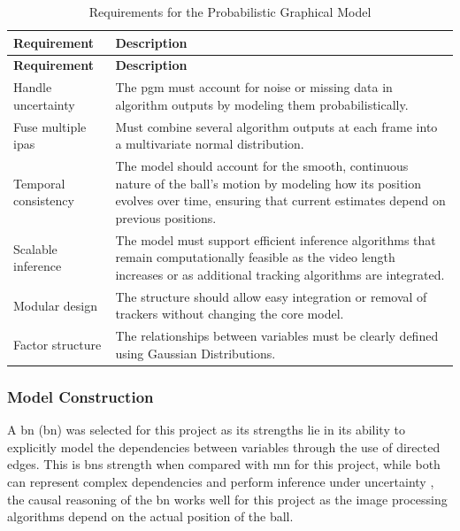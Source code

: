 \documentclass[12pt,a4paper]{article}
\begin{document}
\begin{longtable}{p{} p{}}
\caption{Requirements for the Probabilistic Graphical Model} \label{tab:pgm_requirements} \\
\hline
\textbf{Requirement} & \textbf{Description} \\
\hline
\endfirsthead
\hline
\textbf{Requirement} & \textbf{Description} \\
\hline
\endhead
\hline
\endfoot
\hline
\endlastfoot
Handle uncertainty & The \acs{pgm} must account for noise or missing data in algorithm outputs by modeling them probabilistically. \\

Fuse multiple \acs{ipa}s & Must combine several algorithm outputs at each frame into a multivariate normal distribution. \\

Temporal consistency & The model should account for the smooth, continuous nature of the ball's motion by modeling how its position evolves over time, ensuring that current estimates depend on previous positions.\\

Scalable inference & The model must support efficient inference algorithms that remain computationally feasible as the video length increases or as additional tracking algorithms are integrated. \\

Modular design & The structure should allow easy integration or removal of trackers without changing the core model. \\

Factor structure & The relationships between variables must be clearly defined using Gaussian Distributions. \\
\end{longtable}

\subsubsection{Model Construction}
A \acs{bn} (\acl{bn}) was selected for this project as its strengths lie in its ability to explicitly model the dependencies between variables through the use of directed edges. This is \acs{bn}s strength when compared with \acs{mn} for this project, while both can represent complex dependencies and perform inference under uncertainty \parencite{koller2009pgm}, the causal reasoning of the \acs{bn} works well for this project as the image processing algorithms depend on the actual position of the ball.
\end{document}
